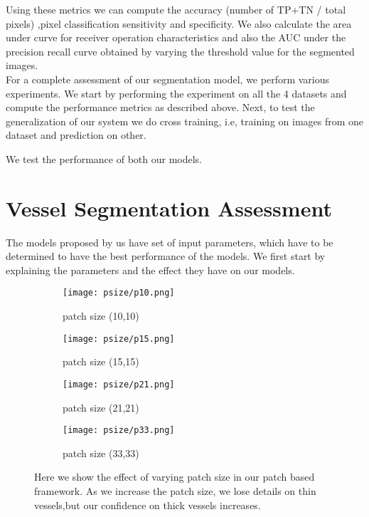 Using these metrics we can compute the accuracy (number of TP+TN / total pixels) ,pixel classification sensitivity and specificity. We also calculate the area under curve for receiver operation characteristics and also the AUC under the precision recall curve obtained by varying the threshold value for the segmented images.\\

For a complete assessment of our segmentation model, we perform various experiments. We start by performing the experiment on all the 4 datasets and compute the performance metrics as described above. Next, to test the generalization of our system we do cross training, i.e, training on images from one dataset and prediction on other.

We test the performance of both our models.  	

\section{Vessel Segmentation Assessment}
The models proposed by us have set of input parameters, which have to be determined to have the best performance of the models. We first start by explaining the parameters and the effect they have on our models.\\
\begin{figure}
	\begin{subfigure}[b]{0.45\textwidth}
		\texttt{[image: psize/p10.png]}
		\caption{patch size (10,10)}
		\label{fig:p10}
	\end{subfigure}
	\begin{subfigure}[b]{0.45\textwidth}
		\texttt{[image: psize/p15.png]}
		\caption{patch size (15,15)}
		\label{fig:p15}
	\end{subfigure}
	
	\begin{subfigure}[b]{0.45\textwidth}
		\texttt{[image: psize/p21.png]}
		\caption{patch size (21,21)}
		\label{fig:p21}
	\end{subfigure}
	\begin{subfigure}[b]{0.45\textwidth}
		\texttt{[image: psize/p33.png]}
		\caption{patch size (33,33)}
		\label{fig:33}
	\end{subfigure}
	\caption[Image segmentation using varying patch sizes]{Here we show the effect of varying patch size in our patch based framework. As we increase the patch size, we lose details on thin vessels,but our confidence on thick vessels increases.}
	\label{fig:patch size}
\end{figure}

